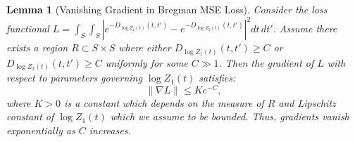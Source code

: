 \documentclass{article}
\theoremstyle{plain}
\newtheorem{lemma}[theorem]{Lemma}
\theoremstyle{definition}
\theoremstyle{remark}
\begin{document}
\begin{lemma}[Vanishing Gradient in Bregman MSE Loss]
\label{lemma:vanishing}
Consider the loss functional $L = \int_{S} \int_{S} \left| e^{-D_{\log Z_{1}(t)}(t,t')} - e^{-D_{\log Z_{2}(t)}(t,t')} \right|^{2} dt \, dt'$. Assume there exists a region $R \subset S \times S$ where either $D_{\log Z_{1}(t)}(t,t') \geq C$ or $D_{\log Z_{2}(t)}(t,t') \geq C$ uniformly for some $C \gg 1$. Then the gradient of $L$ with respect to parameters governing $\log Z_{1}(t)$ satisfies:
\begin{equation}
    \|\nabla L\| \leq K e^{-C},
\end{equation}
where $K > 0$ is a constant which  depends on the measure of $R$ and Lipschitz constant of $\log Z_{1}(t)$ which we assume to be bounded. Thus, gradients vanish exponentially as $C$ increases.
\end{lemma}
\end{document}

